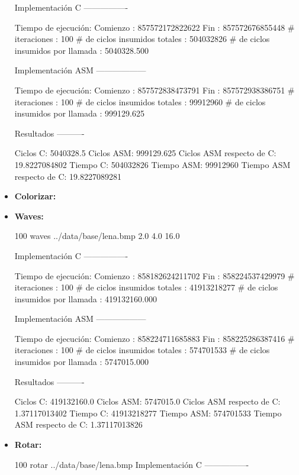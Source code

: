 \documentclass[10pt, a4paper]{article}
\begin{document}
\begin{itemize}
Implementación C
----------------

Tiempo de ejecución:
  Comienzo                          : 857572172822622
  Fin                               : 857572676855448
  # iteraciones                     : 100
  # de ciclos insumidos totales     : 504032826
  # de ciclos insumidos por llamada : 5040328.500

Implementación ASM
------------------

Tiempo de ejecución:
  Comienzo                          : 857572838473791
  Fin                               : 857572938386751
  # iteraciones                     : 100
  # de ciclos insumidos totales     : 99912960
  # de ciclos insumidos por llamada : 999129.625

Resultados
----------

Ciclos C:                 5040328.5
Ciclos ASM:               999129.625
Ciclos ASM respecto de C: 19.8227084802%
Tiempo C:                 504032826
Tiempo ASM:               99912960
Tiempo ASM respecto de C: 19.8227089281%

\item {\textbf{Colorizar:}} 
\item {\textbf{Waves:}}

100 waves ../data/base/lena.bmp 2.0 4.0 16.0

Implementación C
----------------

Tiempo de ejecución:
  Comienzo                          : 858182624211702
  Fin                               : 858224537429979
  # iteraciones                     : 100
  # de ciclos insumidos totales     : 41913218277
  # de ciclos insumidos por llamada : 419132160.000

Implementación ASM
------------------

Tiempo de ejecución:
  Comienzo                          : 858224711685883
  Fin                               : 858225286387416
  # iteraciones                     : 100
  # de ciclos insumidos totales     : 574701533
  # de ciclos insumidos por llamada : 5747015.000

Resultados
----------

Ciclos C:                 419132160.0
Ciclos ASM:               5747015.0
Ciclos ASM respecto de C: 1.37117013402%
Tiempo C:                 41913218277
Tiempo ASM:               574701533
Tiempo ASM respecto de C: 1.37117013826%

\item {\textbf{Rotar:}} 

100 rotar ../data/base/lena.bmp
Implementación C
----------------


\end{itemize}
\end{document}
